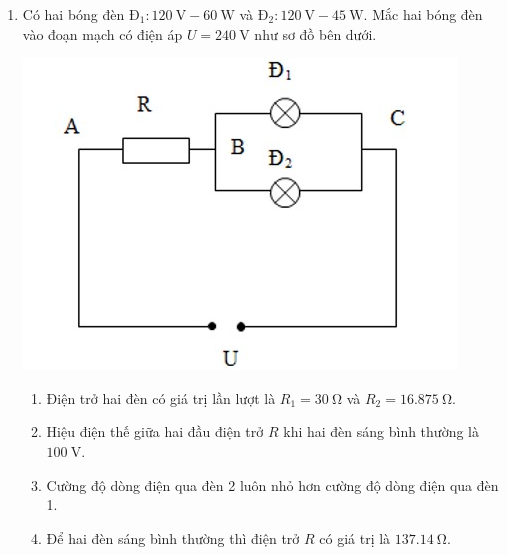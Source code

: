 \begin{enumerate}[label=\bfseries Câu \arabic*:]
\item Có hai bóng đèn  $\text{Đ}_1: \SI{120}{\volt}-\SI{60}{\watt}$ và $\text{Đ}_2: \SI{120}{\volt}-\SI{45}{\watt}$. Mắc hai bóng đèn vào đoạn mạch có điện áp $U=\SI{240}{\volt}$ như sơ đồ bên dưới.
\begin{center}
	\includegraphics[width=0.4\linewidth]{../figs/PH11-FinalSem2-01-4}
\end{center}
\begin{enumerate}[label=\alph*)]
	\item Điện trở hai đèn có giá trị lần lượt là $R_1=\SI{30}{\ohm}$ và $R_2=\SI{16.875}{\ohm}$.
	\item Hiệu điện thế giữa hai đầu điện trở $R$ khi hai đèn sáng bình thường là $\SI{100}{\volt}$.
	\item Cường độ dòng điện qua đèn 2 luôn nhỏ hơn cường độ dòng điện qua đèn 1.
	\item Để hai đèn sáng bình thường thì điện trở $R$ có giá trị là $\SI{137.14}{\ohm}$.
\end{enumerate}
\end{enumerate}
